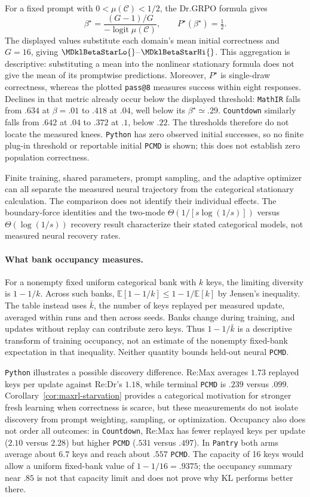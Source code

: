 \documentclass{article}
\newcommand{\1}{\mathbf 1}
\newcommand{\E}{\mathbb E}
\newcommand{\pmd}{\texttt{PCMD}}
\theoremstyle{remark}
\theoremstyle{definition}
\theoremstyle{plain}
\begin{document}
For a fixed prompt with $0<\mu(\mathcal C)<1/2$, the Dr.GRPO formula gives
\[
  \beta^\star=\frac{(G-1)/G}{-\operatorname{logit}\mu(\mathcal C)},
  \qquad P^\star(\beta^\star)=\tfrac12.
\]
The displayed values substitute each domain's mean initial correctness
and $G=16$, giving $\MDklBetaStarLo{}$--$\MDklBetaStarHi{}$.
This aggregation is descriptive: substituting a mean into the nonlinear
stationary formula does not give the mean of its promptwise predictions.
Moreover, $P^\star$ is single-draw correctness, whereas the plotted
\texttt{pass@8} measures success within eight responses. Declines in that
metric already occur below the displayed threshold: \texttt{MathIR} falls from
$.634$ at $\beta=.01$ to $.418$ at $.04$, well below its
$\beta^\star\simeq.29$. \texttt{Countdown} similarly falls from $.642$ at $.04$
to $.372$ at $.1$, below $.22$. The thresholds therefore do not locate
the measured knees. \texttt{Python} has zero observed initial successes, so no
finite plug-in threshold or reportable initial \pmd{} is shown; this
does not establish zero population correctness.

Finite training, shared parameters, prompt sampling, and the adaptive
optimizer can all separate the measured neural trajectory from the
categorical stationary calculation. The comparison does not identify their
individual effects. The boundary-force identities and the two-mode
$\Theta(1/[s\log(1/s)])$ versus $\Theta(\log(1/s))$ recovery result
characterize their stated categorical models, not measured neural recovery
rates.

\paragraph{What bank occupancy measures.}
For a nonempty fixed uniform categorical bank with $k$ keys, the limiting
diversity is $1-1/k$. Across such banks,
$\E[1-1/k]\le1-1/\E[k]$ by Jensen's inequality. The table instead uses
$\bar k$, the number of keys replayed per measured update, averaged within
runs and then across seeds. Banks change during training, and updates
without replay can contribute zero keys. Thus $1-1/\bar k$ is a
descriptive transform of training occupancy, not an estimate of the
nonempty fixed-bank expectation in that inequality. Neither quantity
bounds held-out neural \pmd{}.

\texttt{Python} illustrates a possible discovery difference. Re:Max averages
$1.73$ replayed keys per update against Re:Dr's $1.18$, while terminal
\pmd{} is $.239$ versus $.099$. Corollary~\ref{cor:maxrl-starvation}
provides a categorical motivation for stronger fresh learning when
correctness is scarce, but these measurements do not isolate discovery
from prompt weighting, sampling, or optimization. Occupancy also does not
order all outcomes: in \texttt{Countdown}, Re:Max has fewer replayed keys per
update ($2.10$ versus $2.28$) but higher \pmd{} ($.531$ versus $.497$).
In \texttt{Pantry} both arms average about $6.7$ keys and reach about $.557$ \pmd{}.
The capacity of 16 keys would allow a uniform fixed-bank value of
$1-1/16=.9375$; the occupancy summary near $.85$ is not that capacity
limit and does not prove why KL performs better there.
\end{document}
